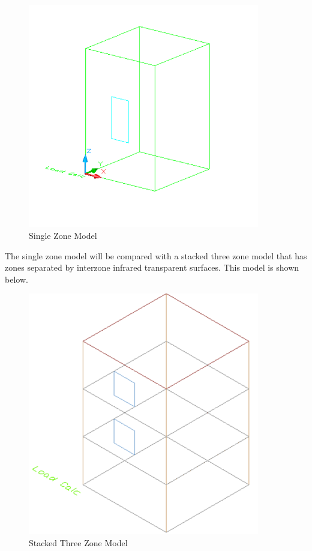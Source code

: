 \begin{figure}[hbtp] %
\centering
\includegraphics[width=0.9\textwidth, height=0.9\textheight, keepaspectratio=true]{media/image396.png}
\caption{Single Zone Model \protect \label{fig:single-zone-model}}
\end{figure}

The single zone model will be compared with a stacked three zone model that has zones separated by interzone infrared transparent surfaces. This model is shown below.

\begin{figure}[hbtp] %
\centering
\includegraphics[width=0.9\textwidth, height=0.9\textheight, keepaspectratio=true]{media/image397.png}
\caption{Stacked Three Zone Model \protect \label{fig:stacked-three-zone-model}}
\end{figure}

